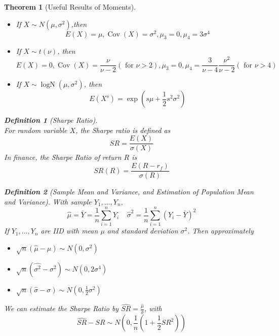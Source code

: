 \documentclass[12pt]{article}
\newtheorem{definition}{Definition}[section]
\newtheorem{theorem}{Theorem}[section]
\theoremstyle{definition}
\DeclareMathOperator{\cov}{Cov}
\DeclareMathOperator{\LogN}{logN}
\begin{document}
\begin{theorem}[Useful Results of Moments]
\hfill\\\normalfont
\begin{itemize}
  \item If $X\sim N(\mu,\sigma^2)$,then
  \[
E(X)=\mu, \cov(X)=\sigma^2, \mu_3=0, \mu_4=3\sigma^4
  \]
  \item If $X\sim t(\nu)$, then
  \[
E(X)=0, \cov(X)=\frac{\nu}{\nu-2}(\text{ for }\nu>2), \mu_3=0, \mu_4=\frac{3}{\nu-4}\frac{\nu^2}{\nu-2}(\text{ for }\nu>4)
  \]
  \item If $X\sim\LogN(\mu, \sigma^2)$, then
  \[
E(X^s)=\exp(s\mu +\frac{1}{2}s^2\sigma^2)
  \]
\end{itemize}
\begin{definition}[Sharpe Ratio]
\hfill\\\normalfont For random variable $X$, the Sharpe ratio is defined as
\[
SR=\frac{E(X)}{\sigma(X)}
\]
In finance, the Sharpe Ratio of return $R$ is
\[
SR(R)=\frac{E(R-r_f)}{\sigma(R)}
\]
\end{definition}
\begin{definition}[Sample Mean and Variance, and Estimation of Population Mean and Variance]
With sample $Y_1, \ldots, Y_n$,
\[
\hat{\mu}=\bar{Y}=\frac{1}{n}\sum_{i=1}^n Y_i\;\;\;\;\hat{\sigma}^2 = \frac{1}{n}\sum_{i=1}^n(Y_i-\bar{Y})^2
\]
If $Y_1,\ldots, Y_n$ are IID with mean $\mu$ and standard deviation $\sigma^2$. Then approximately
\begin{itemize}
  \item $\sqrt{n}(\hat{\mu}-\mu)\sim N(0, \sigma^2)$
  \item $\sqrt{n}(\hat{\sigma^2}-\sigma^2)\sim N(0, 2\sigma^4)$
  \item $\sqrt{n}(\hat{\sigma}-\sigma)\sim N(0, \frac{1}{2}\sigma^2)$
\end{itemize}
\end{definition}
We can estimate the Sharpe Ratio by $\hat{SR}=\frac{\hat{\mu}}{\hat{\sigma}}$, with
\[
\hat{SR}-SR\sim N(0,\frac{1}{n}(1+\frac{1}{2}SR^2))
\]

\end{theorem}
\end{document}

